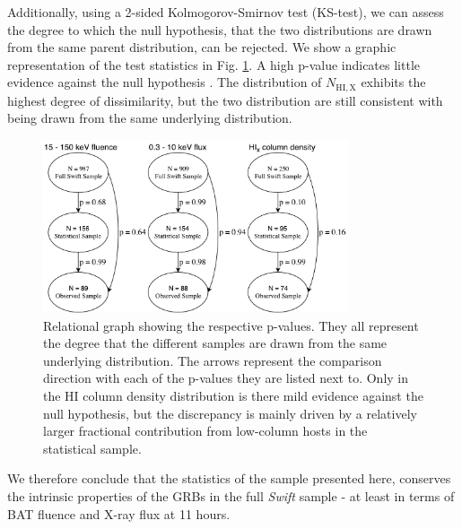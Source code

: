 \documentclass{aa}    %
\begin{document}
Additionally, using a 2-sided Kolmogorov-Smirnov test (KS-test), we can assess
the degree to which the null hypothesis, that the two distributions are drawn
from the same parent distribution, can be rejected. We show a graphic
representation of the test statistics in Fig. \ref{fig:p_values}. A high p-value
indicates little evidence against the null hypothesis . The distribution of
$N_{\mathrm{HI,X}}$ exhibits the highest degree of dissimilarity, but the two
distribution are still consistent with being drawn from the same underlying
distribution.

\begin{figure}
	\centerline{\includegraphics[width=9cm]{figures/XSGRB_p_values.pdf}}
\caption{Relational graph showing the respective p-values. They all represent
	the degree that the different samples are drawn from the same underlying
	distribution. The arrows represent the comparison direction with each of the
	p-values they are listed next to. Only in the HI column density distribution is
	there mild evidence against the null hypothesis, but the discrepancy is mainly
	driven by a relatively larger fractional contribution from low-column hosts in
	the statistical sample.} \label{fig:p_values}
\end{figure}

We therefore conclude that the statistics of the sample presented here,
conserves the intrinsic properties of the GRBs in the full \textit{Swift} sample
- at least in terms of BAT fluence and X-ray flux at 11 hours.

\end{document}
